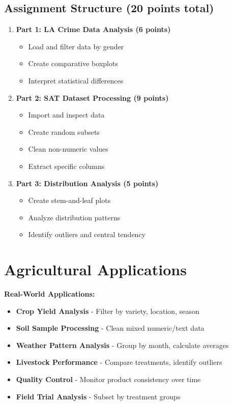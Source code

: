 \documentclass[11pt,a4paper]{article}
\begin{document}
\subsection{Assignment Structure (20 points total)}

\begin{enumerate}
    \item \textbf{Part 1: LA Crime Data Analysis (6 points)}
    \begin{itemize}
        \item Load and filter data by gender
        \item Create comparative boxplots
        \item Interpret statistical differences
    \end{itemize}
    
    \item \textbf{Part 2: SAT Dataset Processing (9 points)}
    \begin{itemize}
        \item Import and inspect data
        \item Create random subsets
        \item Clean non-numeric values
        \item Extract specific columns
    \end{itemize}
    
    \item \textbf{Part 3: Distribution Analysis (5 points)}
    \begin{itemize}
        \item Create stem-and-leaf plots
        \item Analyze distribution patterns
        \item Identify outliers and central tendency
    \end{itemize}
\end{enumerate}

\section{Agricultural Applications}

\begin{infobox}
\textbf{Real-World Applications:}
\begin{itemize}
    \item \textbf{Crop Yield Analysis} - Filter by variety, location, season
    \item \textbf{Soil Sample Processing} - Clean mixed numeric/text data
    \item \textbf{Weather Pattern Analysis} - Group by month, calculate averages
    \item \textbf{Livestock Performance} - Compare treatments, identify outliers
    \item \textbf{Quality Control} - Monitor product consistency over time
    \item \textbf{Field Trial Analysis} - Subset by treatment groups
\end{itemize}
\end{infobox}
\end{document}
